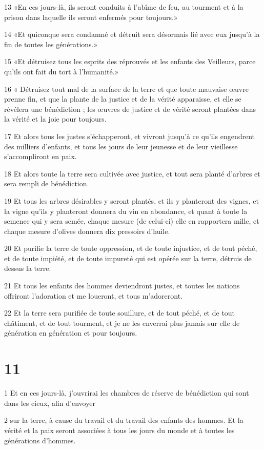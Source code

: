\par 13 «En ces jours-là, ils seront conduits à l'abîme de feu, au tourment et à la prison dans laquelle ils seront enfermés pour toujours.»
\par 14 «Et quiconque sera condamné et détruit sera désormais lié avec eux jusqu'à la fin de toutes les générations.»
\par 15 «Et détruisez tous les esprits des réprouvés et les enfants des Veilleurs, parce qu'ils ont fait du tort à l'humanité.»
\par 16 « Détruisez tout mal de la surface de la terre et que toute mauvaise œuvre prenne fin, et que la plante de la justice et de la vérité apparaisse, et elle se révélera une bénédiction ; les œuvres de justice et de vérité seront plantées dans la vérité et la joie pour toujours.
\par 17 Et alors tous les justes s'échapperont, et vivront jusqu'à ce qu'ils engendrent des milliers d'enfants, et tous les jours de leur jeunesse et de leur vieillesse s'accompliront en paix.
\par 18 Et alors toute la terre sera cultivée avec justice, et tout sera planté d'arbres et sera rempli de bénédiction.
\par 19 Et tous les arbres désirables y seront plantés, et ils y planteront des vignes, et la vigne qu'ils y planteront donnera du vin en abondance, et quant à toute la semence qui y sera semée, chaque mesure (de celui-ci) elle en rapportera mille, et chaque mesure d'olives donnera dix pressoirs d'huile.
\par 20 Et purifie la terre de toute oppression, et de toute injustice, et de tout péché, et de toute impiété, et de toute impureté qui est opérée sur la terre, détruis de dessus la terre.
\par 21 Et tous les enfants des hommes deviendront justes, et toutes les nations offriront l'adoration et me loueront, et tous m'adoreront.
\par 22 Et la terre sera purifiée de toute souillure, et de tout péché, et de tout châtiment, et de tout tourment, et je ne les enverrai plus jamais sur elle de génération en génération et pour toujours.

\chapter{11}

\par 1 Et en ces jours-là, j'ouvrirai les chambres de réserve de bénédiction qui sont dans les cieux, afin d'envoyer
\par 2 sur la terre, à cause du travail et du travail des enfants des hommes. Et la vérité et la paix seront associées à tous les jours du monde et à toutes les générations d’hommes.

